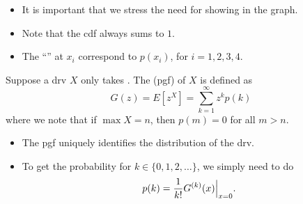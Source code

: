 \documentclass[notoc,notitlepage]{tufte-book}
\begin{document}
\begin{note}
  \begin{itemize}
    \item It is important that we stress the need for showing  in the graph.
    \item Note that the cdf always sums to $1$.
    \item The ``'' at $x_i$ correspond to $p(x_i)$, for $i = 1, 2 ,3, 4$.
  \end{itemize}
\end{note}

\begin{defn}\label{defn:probability_generating_function}
  Suppose a drv $X$ only takes . The  (pgf) of $X$ is defined as
  \begin{equation*}
    G(z) = E\left[ z^X \right] = \sum_{k=1}^{\infty} z^k p(k)
  \end{equation*}
  where we note that if $\max X = n$, then $p(m) = 0$ for all $m > n$.
\end{defn}

\begin{note}
  \begin{itemize}
    \item The pgf uniquely identifies the distribution of the drv.
    \item To get the probability for $k \in \{0, 1, 2, \ldots\}$, we simply need to do
      \begin{equation*}
        p(k) = \frac{1}{k!} G^{(k)}(x) \Big|_{x = 0}^{}.
      \end{equation*}
  \end{itemize}
\end{note}
\end{document}
